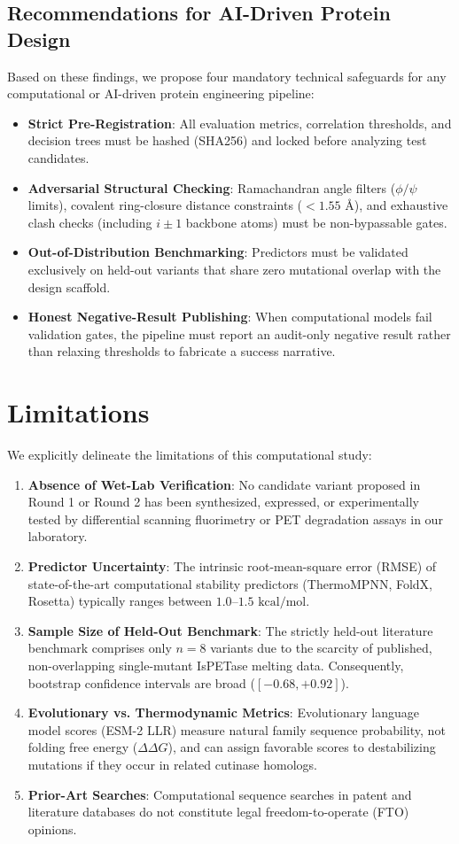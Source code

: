 \documentclass[10pt,twocolumn]{article}
\begin{document}
\subsection{Recommendations for AI-Driven Protein Design}
Based on these findings, we propose four mandatory technical safeguards for any computational or AI-driven protein engineering pipeline:
\begin{itemize}
    \item \textbf{Strict Pre-Registration}: All evaluation metrics, correlation thresholds, and decision trees must be hashed (SHA256) and locked before analyzing test candidates.
    \item \textbf{Adversarial Structural Checking}: Ramachandran angle filters ($\phi/\psi$ limits), covalent ring-closure distance constraints ($< 1.55\text{ \AA}$), and exhaustive clash checks (including $i \pm 1$ backbone atoms) must be non-bypassable gates.
    \item \textbf{Out-of-Distribution Benchmarking}: Predictors must be validated exclusively on held-out variants that share zero mutational overlap with the design scaffold.
    \item \textbf{Honest Negative-Result Publishing}: When computational models fail validation gates, the pipeline must report an audit-only negative result rather than relaxing thresholds to fabricate a success narrative.
\end{itemize}

\section{Limitations}

We explicitly delineate the limitations of this computational study:
\begin{enumerate}
    \item \textbf{Absence of Wet-Lab Verification}: No candidate variant proposed in Round 1 or Round 2 has been synthesized, expressed, or experimentally tested by differential scanning fluorimetry or PET degradation assays in our laboratory.
    \item \textbf{Predictor Uncertainty}: The intrinsic root-mean-square error (RMSE) of state-of-the-art computational stability predictors (ThermoMPNN, FoldX, Rosetta) typically ranges between $1.0\text{--}1.5\text{ kcal/mol}$.
    \item \textbf{Sample Size of Held-Out Benchmark}: The strictly held-out literature benchmark comprises only $n = 8$ variants due to the scarcity of published, non-overlapping single-mutant IsPETase melting data. Consequently, bootstrap confidence intervals are broad ($[-0.68, +0.92]$).
    \item \textbf{Evolutionary vs. Thermodynamic Metrics}: Evolutionary language model scores (ESM-2 LLR) measure natural family sequence probability, not folding free energy ($\Delta\Delta G$), and can assign favorable scores to destabilizing mutations if they occur in related cutinase homologs.
    \item \textbf{Prior-Art Searches}: Computational sequence searches in patent and literature databases do not constitute legal freedom-to-operate (FTO) opinions.
\end{enumerate}
\end{document}

